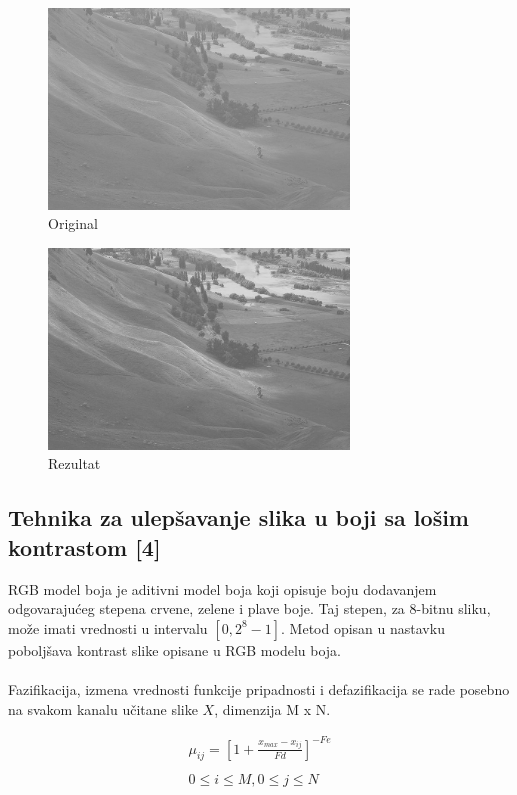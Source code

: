 \documentclass[12pt,a4paper]{article}
\theoremstyle{definition}
\theoremstyle{remark}
\theoremstyle{plain}
\begin{document}
\begin{multicols}{2}
\begin{figure}[H]
\centering
\includegraphics[width=8cm]{images/field.jpg}
  \caption{Original}\label{tree_fuzzy_grayscale_input}
\end{figure}
\columnbreak
\begin{figure}[H]
\centering
\includegraphics[width=8cm]{images/fuzzy_grayscale_2.jpg}
  \caption{Rezultat}\label{fuzzy_grayscale_output2}
\end{figure}
\end{multicols}

\newpage
\subsection{Tehnika za ulep\v savanje slika u boji sa lo\v sim kontrastom [4]}

RGB model boja je aditivni model boja koji opisuje boju dodavanjem odgovaraju\' ceg stepena crvene, zelene i plave boje. Taj stepen, za 8-bitnu sliku, mo\v ze imati vrednosti u intervalu $[0, 2^8 - 1]$. 
Metod opisan u nastavku pobolj\v sava kontrast slike opisane u RGB modelu boja. \\ \\
Fazifikacija, izmena vrednosti funkcije pripadnosti i defazifikacija se rade posebno na svakom kanalu u\v citane slike $X$, dimenzija M x N.

\begin{align*}
  \mu_{ij} = [1 + \frac{x_{max} - x_{ij}}{Fd}]^{-Fe} \\ \\
  0\leq i \leq M, 0\leq j \leq N
\end{align*}
\end{document}
